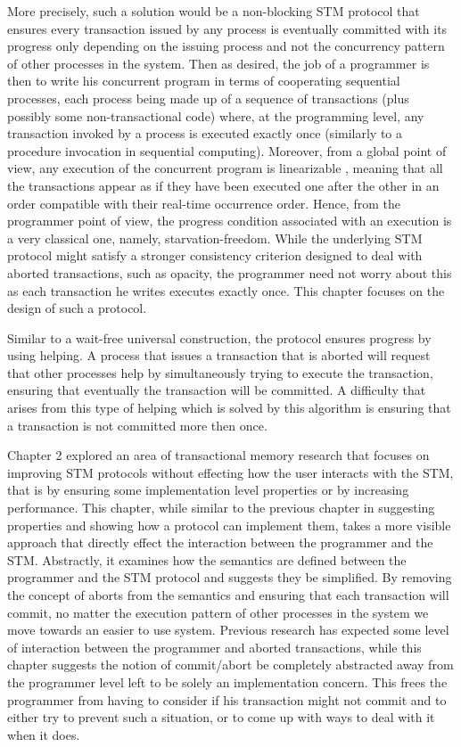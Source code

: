 More precisely, such a solution would be a non-blocking STM protocol that ensures every transaction
issued by any process is eventually committed with its progress only depending
on the issuing process and not the concurrency pattern of other processes in the system.
Then as desired, the job of a
programmer is then to write his concurrent program in terms of cooperating sequential
processes, each process being made up of a sequence of transactions (plus possibly
some non-transactional code) where,
at the programming level, any transaction invoked by
a process is executed exactly once (similarly to a procedure invocation in sequential
computing).
Moreover, from a global point of view, any execution of the concurrent
program is linearizable \cite{HW90}, meaning that all the transactions appear as if they have
been executed one after the other in an order compatible with their real-time occurrence
order. Hence, from the programmer point of view, the progress condition associated
with an execution is a very classical one, namely, starvation-freedom.
While the underlying STM protocol might satisfy a stronger consistency criterion
designed to deal with aborted transactions,
such as opacity, the programmer need not worry about this as each transaction
he writes executes exactly once.
This chapter focuses on the design of such a protocol.



Similar to a wait-free universal construction, the protocol ensures progress
by using helping.
A process that issues a transaction that is aborted will request 
that other processes help by simultaneously trying to execute the transaction,
ensuring that eventually the transaction will be committed.
A difficulty that arises from this type of helping 
which is solved by this algorithm
is ensuring that a transaction is not committed more then once.


Chapter 2 explored an area of transactional memory
research that focuses on improving STM protocols without effecting
how the user interacts with the STM, that is by ensuring some implementation
level properties or by increasing performance.
This chapter, while similar to the previous chapter in suggesting properties
and showing how a protocol can implement them,
takes a more visible approach
that directly effect the interaction between the programmer and
the STM.
Abstractly, it examines how the semantics are defined between
the programmer and the STM protocol and suggests they be simplified.
By removing the concept of aborts from the semantics and
ensuring that each transaction will commit, no matter the 
execution pattern of other processes in the system
we move towards an easier to use system.
Previous research has expected some level of interaction
between the programmer and aborted transactions, while this
chapter suggests the notion of commit/abort be completely abstracted
away from the programmer level left to be solely an implementation
concern.
This frees the programmer from having to consider if his transaction
might not commit and to either try to prevent such a situation, or to 
come up with ways to deal with it when it does.

